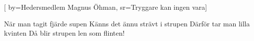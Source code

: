 [
	by={Hedersmedlem Magnus Öhman},					
	sr={Tryggare kan ingen vara}]					
	
\beginverse*
När man tagit fjärde supen
Känns det ännu strävt i strupen
Därför tar man lilla kvinten
Då blir strupen len som flinten!
\endverse									
\endsong							
